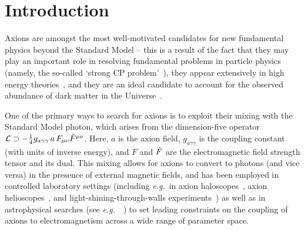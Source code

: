 \documentclass[twocolumn,superscriptaddress,floatfix,preprintnumbers,prd,nofootinbib,aps,10pt]{revtex4-2}
\renewcommand\({\left(}
\renewcommand\){\right)}
\renewcommand\[{\left[}
\renewcommand\]{\right]}
\newcommand\eg{{\it e.g.}~}
\begin{document}
\maketitle


\section{Introduction}\label{sec:intro}
Axions are amongst the most well-motivated candidates for new fundamental physics beyond the Standard Model -- this is a result of the fact that they may play an important role in resolving fundamental problems in particle physics (namely, the so-called `strong CP problem'~\cite{PQ1,PQ2,WeinbergAxion,WilczekAxion}), they appear extensively in high energy theories~\cite{Arvanitaki:2009fg,Witten:1984dg,Cicoli:2012sz,Conlon:2006tq,Svrcek:2006yi}, and they are an ideal candidate to account for the observed abundance of dark matter in the Universe~\cite{PRESKILL1983127,Abbott1982,Fischler1982}.

One of the primary ways to search for axions is to exploit their mixing with the Standard Model photon, which arises from the dimension-five operator $\mathcal{L} \supset -\frac{1}{4} g_{a \gamma\gamma} \, a \, F_{\mu\nu} \Tilde{F}^{\mu\nu} $. Here, $a$ is the axion field, $g_{a\gamma\gamma}$ is the coupling constant (with units of inverse energy), and $F$ and $\Tilde{F}$ are the electromagnetic field strength tensor and its dual. This mixing allows for axions to convert to photons (and vice versa) in the presence of external magnetic fields, and has been employed in controlled laboratory settings (including \eg in axion haloscopes~\cite{Sikivie1983,DePanfilis:1987,Hagmann:1990,Hagmann:1998cb,Asztalos:2001tf,Asztalos:2009yp,Du:2018uak,Braine2020,Bradley2003,Bradley2004,Shokair2014,HAYSTAC,Zhong2018,Backes_2021,mcallister2017organ,QUAX:2020adt,Choi_2021,TheMADMAXWorkingGroup:2016hpc,Majorovits:2017ppy,MashaCurlyRobert2018}, axion helioscopes~\cite{CAST2009,CAST2015, Anastassopoulos2017}, and light-shining-through-walls experiments~\cite{Bibber1987,Rabadan2006,Adler2008}) as well as in astrophysical searches (see \eg~\cite{Wouters:2013hua,HESS:2013udx,Payez_2015,Fermi-LAT:2016nkz,Meyer:2016wrm,Marsh:2017yvc,Reynolds:2019uqt,Xiao:2020pra,Li:2020pcn,Dessert:2020lil,Dessert1_2022,Dessert2_2022,Noordhuis:2022ljw,Foster:2022fxn,Battye:2023oac,Janish:2023kvi,Todarello:2023hdk,Grin:2006aw,Wadekar:2021qae,Dolan:2022kul}) to set leading constraints on the coupling of axions to electromagnetism across a wide range of parameter space.
\end{document}
